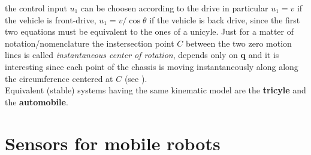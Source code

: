 the control input $u_1$ can be choosen according to the drive in particular $u_1=v$ if the vehicle is front-drive, $u_1=v/\cos\theta$ if the vehicle is back drive, since the first two equations must be equivalent to the ones of a unicyle. Just for a matter of notation/nomenclature the instersection point $C$ between the two zero motion lines is called \textit{instantaneous center of rotation}, depends only on $\mathbf{q}$ and it is interesting since each point of the chassis is moving instantaneously along along the circumference centered at $C$ (see ).\\
Equivalent (stable) systems having the same kinematic model are the \textbf{tricyle} and the \textbf{automobile}.

\section{Sensors for mobile robots}

